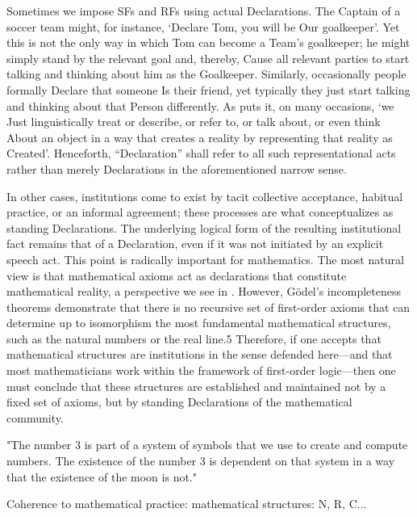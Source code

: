 \documentclass[11pt,a4paper]{article}
\begin{document}
Sometimes we impose SFs and RFs using actual Declarations. The Captain of a soccer team might, for instance, `Declare Tom, you will be Our goalkeeper'. Yet this is not the only way in which Tom can become a Team's goalkeeper; he might simply stand by the relevant goal and, thereby, Cause all relevant parties to start talking and thinking about him as the Goalkeeper. Similarly, occasionally people formally Declare that someone Is their friend, yet typically they just start talking and thinking about that Person differently. As \textcite[10]{searle2010} puts it, on many occasions, `we Just linguistically treat or describe, or refer to, or talk about, or even think About an object in a way that creates a reality by representing that reality as Created'. Henceforth, ``Declaration'' shall refer to all such representational acts rather than merely Declarations in the aforementioned narrow sense. 

In other cases, institutions come to exist by tacit collective acceptance, habitual practice, or an informal agreement; these processes are what \textcite[...]{Cole2013} conceptualizes as standing Declarations. The underlying logical form of the resulting institutional fact remains that of a Declaration, even if it was not initiated by an explicit speech act. This point is radically important for mathematics. The most natural view is that mathematical axioms act as declarations that constitute mathematical reality, a perspective we see in \textcite[...]{SchmidtVenturi2024}. However, Gödel's incompleteness theorems demonstrate that there is no recursive set of first-order axioms that can determine up to isomorphism the most fundamental mathematical structures, such as the natural numbers or the real line.5 Therefore, if one accepts that mathematical structures are institutions in the sense defended here—and that most mathematicians work within the framework of first-order logic—then one must conclude that these structures are established and maintained not by a fixed set of axioms, but by standing Declarations of the mathematical community. 

"The number 3 is part of a system of symbols that we use to create and compute numbers. The existence of the number 3 is dependent on that system in a way that the existence of the moon is not." 

Coherence to mathematical practice: mathematical structures: N, R, C... 
\end{document}
